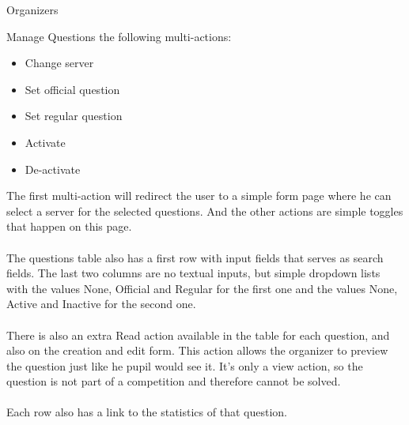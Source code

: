 \begin{section}{Organizers}
\begin{subsection}{Manage Questions}
		the following multi-actions:
		\begin{itemize}
			\item Change server
			\item Set official question
			\item Set regular question
			\item Activate
			\item De-activate
		\end{itemize}
		The first multi-action will redirect the user to a simple form page where he can
		select a server for the selected questions. And the other actions are simple
		toggles that happen on this page.\\
		\\
		The questions table also has a first row with input fields that serves as
		search fields. The last two columns are no textual inputs, but simple dropdown
		lists with the values None, Official and Regular for the first one and the
		values None, Active and Inactive for the second one.\\
		\\
		There is also an extra Read action available in the table for each question, and
		also on the creation and edit form. This action allows the organizer to preview
		the question just like he pupil would see it. It's only a view action, so the
		question is not part of a competition and therefore cannot be solved. \\
		\\
		Each row also has a link to the statistics of that question.
	\end{subsection}
	

\end{section}
